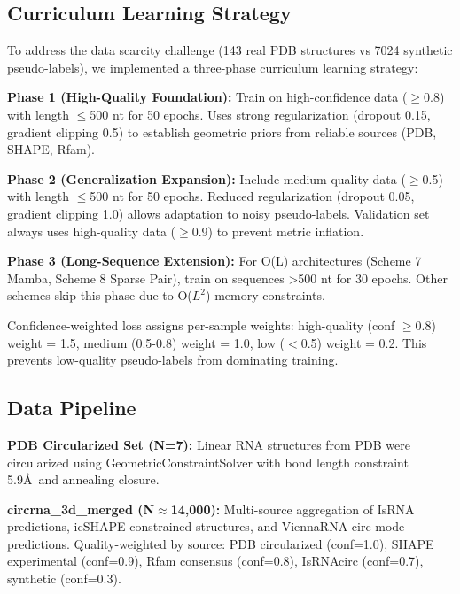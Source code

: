 \documentclass[12pt]{article}
\begin{document}
\subsection{Curriculum Learning Strategy}

To address the data scarcity challenge (143 real PDB structures vs 7024 synthetic pseudo-labels), we implemented a three-phase curriculum learning strategy:

\textbf{Phase 1 (High-Quality Foundation):} Train on high-confidence data ($\geq$0.8) with length $\leq$500 nt for 50 epochs. Uses strong regularization (dropout 0.15, gradient clipping 0.5) to establish geometric priors from reliable sources (PDB, SHAPE, Rfam).

\textbf{Phase 2 (Generalization Expansion):} Include medium-quality data ($\geq$0.5) with length $\leq$500 nt for 50 epochs. Reduced regularization (dropout 0.05, gradient clipping 1.0) allows adaptation to noisy pseudo-labels. Validation set always uses high-quality data ($\geq$0.9) to prevent metric inflation.

\textbf{Phase 3 (Long-Sequence Extension):} For O(L) architectures (Scheme 7 Mamba, Scheme 8 Sparse Pair), train on sequences >500 nt for 30 epochs. Other schemes skip this phase due to O($L^2$) memory constraints.

Confidence-weighted loss assigns per-sample weights: high-quality (conf $\geq$0.8) weight = 1.5, medium (0.5-0.8) weight = 1.0, low ($<$0.5) weight = 0.2. This prevents low-quality pseudo-labels from dominating training.

\subsection{Data Pipeline}

\textbf{PDB Circularized Set (N=7):} Linear RNA structures from PDB were circularized using GeometricConstraintSolver with bond length constraint 5.9\AA\ and annealing closure.

\textbf{circrna\_3d\_merged (N$\approx$14,000):} Multi-source aggregation of IsRNA predictions, icSHAPE-constrained structures, and ViennaRNA circ-mode predictions. Quality-weighted by source: PDB circularized (conf=1.0), SHAPE experimental (conf=0.9), Rfam consensus (conf=0.8), IsRNAcirc (conf=0.7), synthetic (conf=0.3).
\end{document}
